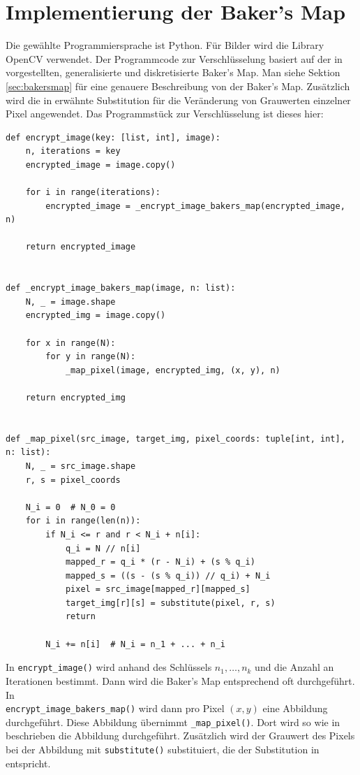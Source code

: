 
\usepackage[naustrian]{babel}


\maketitle

\section{Implementierung der Baker's Map}
Die gewählte Programmiersprache ist Python.
Für Bilder wird die Library OpenCV verwendet. Der Programmcode zur Verschlüsselung basiert auf der in
\cite{fridrich97} vorgestellten, generalisierte und diskretisierte Baker's Map. Man siehe Sektion
\ref{sec:bakersmap} für eine genauere Beschreibung von der Baker's Map. Zusätzlich wird die in \cite{chaos}
erwähnte Substitution für die Veränderung von Grauwerten einzelner Pixel angewendet. Das Programmstück
zur Verschlüsselung ist dieses hier:
\begin{lstlisting}
def encrypt_image(key: [list, int], image):
    n, iterations = key
    encrypted_image = image.copy()

    for i in range(iterations):
        encrypted_image = _encrypt_image_bakers_map(encrypted_image, n)

    return encrypted_image


def _encrypt_image_bakers_map(image, n: list):
    N, _ = image.shape
    encrypted_img = image.copy()

    for x in range(N):
        for y in range(N):
            _map_pixel(image, encrypted_img, (x, y), n)

    return encrypted_img


def _map_pixel(src_image, target_img, pixel_coords: tuple[int, int], n: list):
    N, _ = src_image.shape
    r, s = pixel_coords

    N_i = 0  # N_0 = 0
    for i in range(len(n)):
        if N_i <= r and r < N_i + n[i]:
            q_i = N // n[i]
            mapped_r = q_i * (r - N_i) + (s % q_i)
            mapped_s = ((s - (s % q_i)) // q_i) + N_i
            pixel = src_image[mapped_r][mapped_s]
            target_img[r][s] = substitute(pixel, r, s)
            return

        N_i += n[i]  # N_i = n_1 + ... + n_i
\end{lstlisting}
In \lstinline{encrypt_image()} wird anhand des Schlüssels $n_1, \dots, n_k$ und die Anzahl an Iterationen bestimmt.
Dann wird die Baker's Map entsprechend oft durchgeführt. In \\\lstinline{encrypt_image_bakers_map()} wird dann
pro Pixel $(x, y)$ eine Abbildung durchgeführt. Diese Abbildung übernimmt \lstinline{_map_pixel()}. Dort
wird so wie in \cite{fridrich97} beschrieben die Abbildung durchgeführt. Zusätzlich wird der Grauwert des Pixels bei
der Abbildung mit \lstinline{substitute()} substituiert, die der Substitution in \cite{chaos} entspricht.


